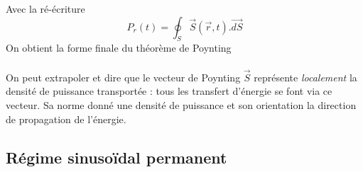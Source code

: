 	Avec la ré-écriture
	\begin{equation}
	P_r(t) = \oint_S \vec{S}(\vec{r},t).\vec{dS}
	\end{equation}
	On obtient la forme finale du théorème de Poynting \\
	\ \\
	
	On peut extrapoler et dire que le vecteur de Poynting $\vec{S}$ représente \textit{localement} 
	la densité de puissance transportée : tous les transfert d'énergie se font via ce vecteur. Sa 
	norme donné une densité de puissance et son orientation la direction de propagation de l'énergie. 
	
	
	\subsection{Régime sinusoïdal permanent}
	
	
	
	
	
	
	
	
	
	
	
	
	
	